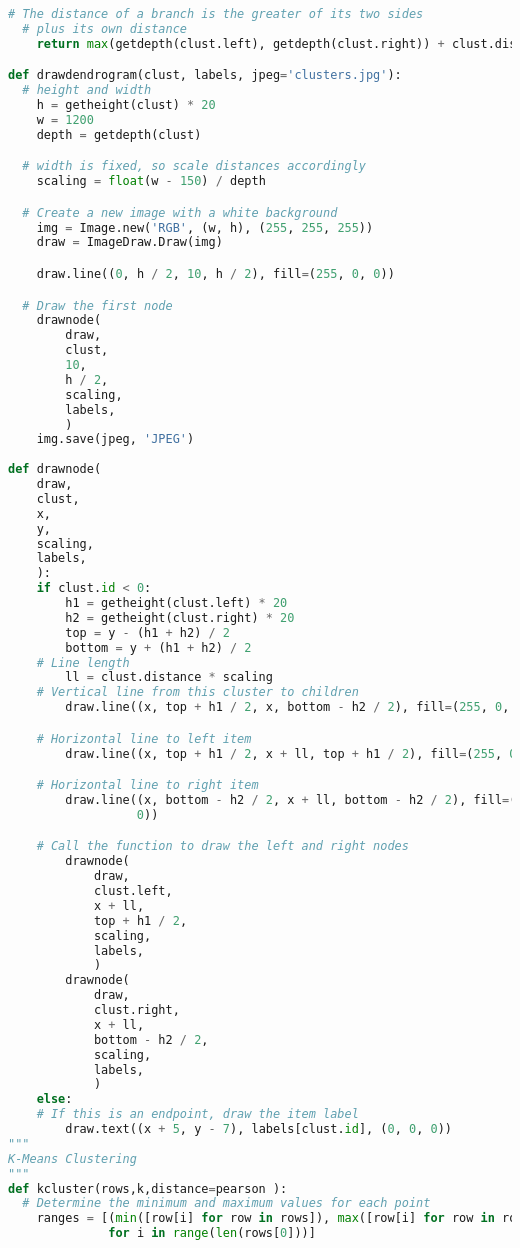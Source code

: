 \documentclass[12pt]{article}
\begin{document}
\begin{lstlisting}[language=Python, caption=three.py , label=2nd:copy]
  # The distance of a branch is the greater of its two sides
  # plus its own distance
    return max(getdepth(clust.left), getdepth(clust.right)) + clust.distance

def drawdendrogram(clust, labels, jpeg='clusters.jpg'):
  # height and width
    h = getheight(clust) * 20
    w = 1200
    depth = getdepth(clust)

  # width is fixed, so scale distances accordingly
    scaling = float(w - 150) / depth

  # Create a new image with a white background
    img = Image.new('RGB', (w, h), (255, 255, 255))
    draw = ImageDraw.Draw(img)

    draw.line((0, h / 2, 10, h / 2), fill=(255, 0, 0))

  # Draw the first node
    drawnode(
        draw,
        clust,
        10,
        h / 2,
        scaling,
        labels,
        )
    img.save(jpeg, 'JPEG')
    
def drawnode(
    draw,
    clust,
    x,
    y,
    scaling,
    labels,
    ):
    if clust.id < 0:
        h1 = getheight(clust.left) * 20
        h2 = getheight(clust.right) * 20
        top = y - (h1 + h2) / 2
        bottom = y + (h1 + h2) / 2
    # Line length
        ll = clust.distance * scaling
    # Vertical line from this cluster to children
        draw.line((x, top + h1 / 2, x, bottom - h2 / 2), fill=(255, 0, 0))

    # Horizontal line to left item
        draw.line((x, top + h1 / 2, x + ll, top + h1 / 2), fill=(255, 0, 0))

    # Horizontal line to right item
        draw.line((x, bottom - h2 / 2, x + ll, bottom - h2 / 2), fill=(255, 0,
                  0))

    # Call the function to draw the left and right nodes
        drawnode(
            draw,
            clust.left,
            x + ll,
            top + h1 / 2,
            scaling,
            labels,
            )
        drawnode(
            draw,
            clust.right,
            x + ll,
            bottom - h2 / 2,
            scaling,
            labels,
            )
    else:
    # If this is an endpoint, draw the item label
        draw.text((x + 5, y - 7), labels[clust.id], (0, 0, 0))
"""
K-Means Clustering
"""       
def kcluster(rows,k,distance=pearson ):
  # Determine the minimum and maximum values for each point
    ranges = [(min([row[i] for row in rows]), max([row[i] for row in rows]))
              for i in range(len(rows[0]))]


\end{lstlisting}
\end{document}
